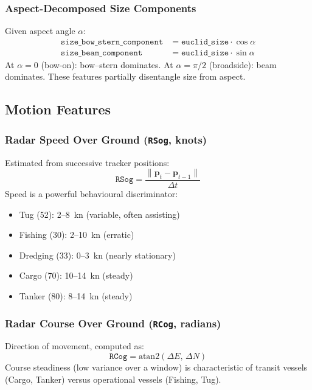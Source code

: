 \documentclass[journal]{IEEEtran}
\newcommand{\vect}[1]{\boldsymbol{#1}}
\begin{document}
\subsubsection{Aspect-Decomposed Size Components}

Given aspect angle $\alpha$:
\begin{align}
  \texttt{size\_bow\_stern\_component} &= \texttt{euclid\_size} \cdot \cos\alpha \\
  \texttt{size\_beam\_component}       &= \texttt{euclid\_size} \cdot \sin\alpha
\end{align}
At $\alpha=0$ (bow-on): bow--stern dominates. At $\alpha=\pi/2$ (broadside):
beam dominates. These features partially disentangle size from aspect.

\subsection{Motion Features}

\subsubsection{Radar Speed Over Ground (\texttt{RSog}, knots)}

Estimated from successive tracker positions:
\begin{equation}
  \texttt{RSog} = \frac{\|\vect{p}_t - \vect{p}_{t-1}\|}{\Delta t}
\end{equation}
Speed is a powerful behavioural discriminator:
\begin{itemize}
  \item Tug (52): 2--8~kn (variable, often assisting)
  \item Fishing (30): 2--10~kn (erratic)
  \item Dredging (33): 0--3~kn (nearly stationary)
  \item Cargo (70): 10--14~kn (steady)
  \item Tanker (80): 8--14~kn (steady)
\end{itemize}

\subsubsection{Radar Course Over Ground (\texttt{RCog}, radians)}

Direction of movement, computed as:
\begin{equation}
  \texttt{RCog} = \text{atan2}(\Delta E,\, \Delta N)
\end{equation}
Course steadiness (low variance over a window) is characteristic of transit
vessels (Cargo, Tanker) versus operational vessels (Fishing, Tug).
\end{document}
